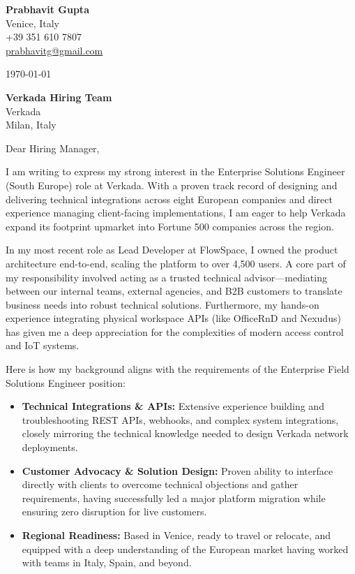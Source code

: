 \documentclass[11pt,a4paper]{article}
\begin{document}
\begin{flushleft}
\textbf{Prabhavit Gupta} \\
Venice, Italy \\
+39 351 610 7807 \\
\href{mailto:prabhavitg@gmail.com}{prabhavitg@gmail.com} \\
\end{flushleft}

\vspace{1cm}
\noindent\today

\vspace{1cm}
\noindent\textbf{Verkada Hiring Team} \\
Verkada \\
Milan, Italy

\vspace{1cm}
\noindent Dear Hiring Manager,

\vspace{0.5cm}
\noindent I am writing to express my strong interest in the Enterprise Solutions Engineer (South Europe) role at Verkada. With a proven track record of designing and delivering technical integrations across eight European companies and direct experience managing client-facing implementations, I am eager to help Verkada expand its footprint upmarket into Fortune 500 companies across the region.

\vspace{0.5cm}
\noindent In my most recent role as Lead Developer at FlowSpace, I owned the product architecture end-to-end, scaling the platform to over 4,500 users. A core part of my responsibility involved acting as a trusted technical advisor---mediating between our internal teams, external agencies, and B2B customers to translate business needs into robust technical solutions. Furthermore, my hands-on experience integrating physical workspace APIs (like OfficeRnD and Nexudus) has given me a deep appreciation for the complexities of modern access control and IoT systems. 

\vspace{0.5cm}
\noindent Here is how my background aligns with the requirements of the Enterprise Field Solutions Engineer position:

\begin{itemize}
    \item \textbf{Technical Integrations \& APIs:} Extensive experience building and troubleshooting REST APIs, webhooks, and complex system integrations, closely mirroring the technical knowledge needed to design Verkada network deployments.
    \item \textbf{Customer Advocacy \& Solution Design:} Proven ability to interface directly with clients to overcome technical objections and gather requirements, having successfully led a major platform migration while ensuring zero disruption for live customers.
    \item \textbf{Regional Readiness:} Based in Venice, ready to travel or relocate, and equipped with a deep understanding of the European market having worked with teams in Italy, Spain, and beyond.
\end{itemize}
\end{document}
